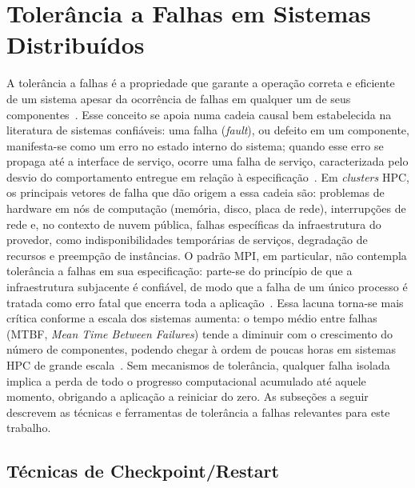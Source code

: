 \section{Tolerância a Falhas em Sistemas Distribuídos}
\label{sec:fault-tolerance}

A tolerância a falhas é a propriedade que garante a operação correta e eficiente de um
sistema apesar da ocorrência de falhas em qualquer um de seus
componentes~\cite{avizienis2004taxonomy}. Esse conceito se apoia numa cadeia causal bem
estabelecida na literatura de sistemas confiáveis: uma falha (\textit{fault}), ou
defeito em um componente, manifesta-se como um erro no estado interno
do sistema; quando esse erro se propaga até a interface de serviço, ocorre uma falha de
serviço, caracterizada pelo desvio do comportamento entregue em
relação à especificação~\cite{avizienis2004taxonomy}. Em \textit{clusters} HPC, os principais
vetores de falha que dão origem a essa cadeia são: problemas de hardware em nós de
computação (memória, disco, placa de rede), interrupções de rede e, no contexto de
nuvem pública, falhas específicas da infraestrutura do provedor, como indisponibilidades
temporárias de serviços, degradação de recursos e preempção de instâncias. O padrão
MPI, em particular, não contempla tolerância a falhas em sua especificação: parte-se do princípio de que a
infraestrutura subjacente é confiável, de modo que a falha de um único processo é
tratada como erro fatal que encerra toda a aplicação~\cite{camargo2017ftmpi}. Essa
lacuna torna-se mais crítica conforme a escala dos sistemas aumenta: o tempo médio
entre falhas (MTBF, \textit{Mean Time Between Failures}) tende a diminuir com o
crescimento do número de componentes, podendo chegar à ordem de poucas horas em
sistemas HPC de grande escala~\cite{moody2010scr,camargo2017ftmpi}. Sem mecanismos de
tolerância, qualquer falha isolada implica a perda de todo o progresso computacional
acumulado até aquele momento, obrigando a aplicação a reiniciar do zero. As subseções a
seguir descrevem as técnicas e ferramentas de tolerância a falhas relevantes para este
trabalho.

\subsection{Técnicas de Checkpoint/Restart}
\label{sec:checkpoint-restart}

